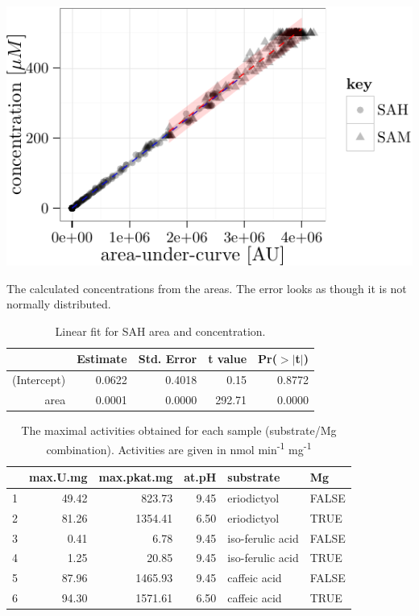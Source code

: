 \documentclass[]{tufte-handout}
\begin{document}
\begin{marginfigure}
 \includegraphics{analysis_tufte_files/figure-latex/unnamed-chunk-13-1.pdf}
\caption{The calculated concentrations from the areas. The error looks as though it is not normally distributed.}
\end{marginfigure}\begin{table}[ht]
\centering
\begin{tabular}{rrrrr}
  \toprule
 & Estimate & Std. Error & t value & Pr($>$$|$t$|$) \\ 
  \midrule
(Intercept) & 0.0622 & 0.4018 & 0.15 & 0.8772 \\ 
  area & 0.0001 & 0.0000 & 292.71 & 0.0000 \\ 
   \bottomrule
\end{tabular}
\caption{Linear fit for SAH area and concentration.} 
\end{table}\begin{table}[ht]
\centering
\begin{tabular}{rrrrll}
  \toprule
 & max.U.mg & max.pkat.mg & at.pH & substrate & Mg \\ 
  \midrule
1 & 49.42 & 823.73 & 9.45 & eriodictyol & FALSE \\ 
  2 & 81.26 & 1354.41 & 6.50 & eriodictyol & TRUE \\ 
  3 & 0.41 & 6.78 & 9.45 & iso-ferulic acid & FALSE \\ 
  4 & 1.25 & 20.85 & 9.45 & iso-ferulic acid & TRUE \\ 
  5 & 87.96 & 1465.93 & 9.45 & caffeic acid & FALSE \\ 
  6 & 94.30 & 1571.61 & 6.50 & caffeic acid & TRUE \\ 
   \bottomrule
\end{tabular}
\caption{The maximal activities obtained for each sample (substrate/Mg combination). Activities are given in nmol min\textsuperscript{-1} mg\textsuperscript{-1}} 
\end{table}
\end{document}
